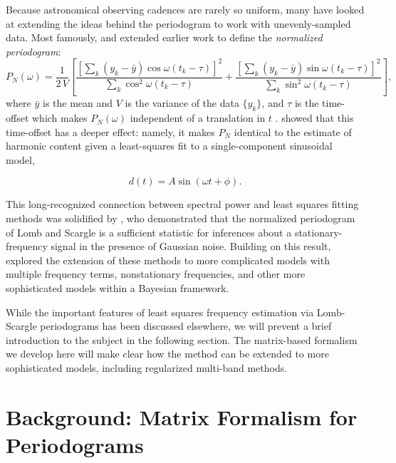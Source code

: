 \documentclass[12pt,preprint]{aastex}
\newcommand{\eqlabel}[1]{\label{eq:#1}}
\begin{document}
Because astronomical observing cadences are rarely so uniform, many have looked at extending the ideas behind the periodogram to work with unevenly-sampled data. Most famously, \citet{Lomb76} and \citet{Scargle82} extended earlier work to define the {\it normalized periodogram}:
\begin{equation}
  \eqlabel{LombScargle}
  P_N(\omega) = \frac{1}{2\,V}\left[
    \frac{\left[\sum_k(y_k - \bar{y})\cos\omega(t_k - \tau)\right]^2}
    {\sum_k \cos^2\omega(t_k - \tau)}
    +
    \frac{\left[\sum_k(y_k - \bar{y})\sin\omega(t_k - \tau)\right]^2}
    {\sum_k \sin^2\omega(t_k - \tau)}
\right],
\end{equation}
where $\bar{y}$ is the mean and $V$ is the variance of the data $\{y_k\}$, and $\tau$ is the time-offset which makes $P_N(\omega)$ independent of a translation in $t$ \citep[see][for an in-depth discussion]{NumRec}. \citet{Lomb76} showed that this time-offset has a deeper effect: namely, it makes $P_N$ identical to the estimate of harmonic content given a least-squares fit to a single-component sinusoidal model,

\begin{equation}
  \eqlabel{SingleModel}
  d(t) = A\sin(\omega t + \phi).
\end{equation}

This long-recognized connection between spectral power and least squares fitting methods was solidified by \citet{Jaynes87}, who demonstrated that the normalized periodogram of Lomb and Scargle is a sufficient statistic for inferences about a stationary-frequency signal in the presence of Gaussian noise. Building on this result, \citet{Bretthorst88} explored the extension of these methods to more complicated models with multiple frequency terms, nonstationary frequencies, and other more sophisticated models within a Bayesian framework.

While the important features of least squares frequency estimation via Lomb-Scargle periodograms has been discussed elsewhere, we will prevent a brief introduction to the subject in the following section.
The matrix-based formalism we develop here will make clear how the method can be extended to more sophisticated models, including regularized multi-band methods.


\section{Background: Matrix Formalism for Periodograms}
\end{document}
